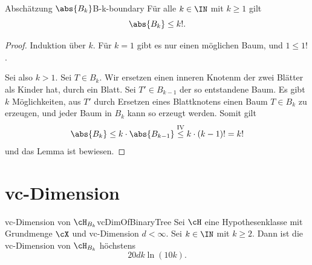 \documentclass[language=ngerman,algolist,acrolist]{TemplateLecture}
\begin{document}
\begin{lem}{Abschätzung $\abs{B_k}$}{B-k-boundary}
    Für alle $k \in \IN$ mit $k \geq 1$ gilt 
    \begin{equation*}
        \abs{B_k} \leq k!.
    \end{equation*}
\end{lem}
\begin{proof}
    Induktion über $k$. Für $k = 1$ gibt es nur einen möglichen Baum, und $1 \leq 1!$.

    Sei also $k > 1$. Sei $T \in B_k$. Wir ersetzen einen inneren Knotenm der zwei Blätter als Kinder hat, durch ein Blatt. Sei $T' \in B_{k-1}$ der so entstandene Baum. Es gibt $k$ Möglichkeiten, aus $T'$ durch Ersetzen eines Blattknotens einen Baum $T \in B_k$ zu erzeugen, und jeder Baum in $B_k$ kann so erzeugt werden. Somit gilt 
    \begin{equation*}
        \abs{B_k} \leq k \cdot \abs{B_{k-1}} \overset{\text{IV}}{\leq} k \cdot (k-1)! = k!
    \end{equation*}
    und das Lemma ist bewiesen.
\end{proof}

\section{\acs{vc}-Dimension}

\begin{thm}{\acs{vc}-Dimension von $\cH_{B_k}$}{vcDimOfBinaryTree}
    Sei $\cH$ eine Hypothesenklasse mit Grundmenge $\cX$ und \acs{vc}-Dimension $d < \infty$. Sei $k \in \IN$ mit $k \geq 2$. Dann ist die \acs{vc}-Dimension von $\cH_{B_k}$ höchstens 
    \begin{equation*}
        20 d k \ln(10k).
    \end{equation*} 
\end{thm}
\end{document}
